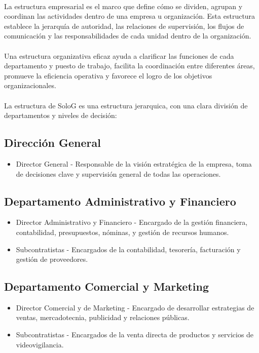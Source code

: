 \documentclass{report}
\begin{document}
          \paragraph*{}{
            La estructura empresarial es el marco que define cómo se dividen, agrupan y coordinan las actividades dentro de una empresa u organización. 
            Esta estructura establece la jerarquía de autoridad, las relaciones de supervisión, los flujos de comunicación y las responsabilidades de cada unidad dentro de la organización.
          }
          \paragraph*{}
          {
            Una estructura organizativa eficaz ayuda a clarificar las funciones de cada departamento y puesto de trabajo, facilita la coordinación entre diferentes áreas, promueve la eficiencia operativa y favorece el logro de los objetivos organizacionales.
          }
          \paragraph*{}
          {
            La estructura de SoloG es una estructura jerarquica, con una clara división de departamentos y niveles de decisión:
          }
          \subsection{Dirección General}
            \begin{itemize}
            \item Director General - Responsable de la visión estratégica de la empresa, toma de decisiones clave y supervisión general de todas las operaciones.
            \end{itemize}
          \subsection{Departamento Administrativo y Financiero}
            \begin{itemize}
            \item Director Administrativo y Financiero - Encargado de la gestión financiera, contabilidad, presupuestos, nóminas, y gestión de recursos humanos.
            \item Subcontratistas - Encargados de la contabilidad, tesorería, facturación y gestión de proveedores.
            \end{itemize}
          \subsection{Departamento Comercial y Marketing}
            \begin{itemize}
            \item Director Comercial y de Marketing - Encargado de desarrollar estrategias de ventas, mercadotecnia, publicidad y relaciones públicas.
            \item Subcontratistas - Encargados de la venta directa de productos y servicios de videovigilancia.
            \end{itemize}
\end{document}
